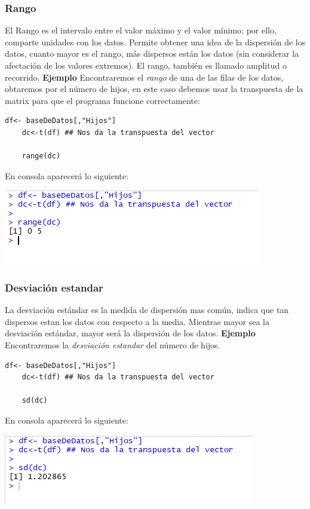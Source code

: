 \documentclass[12pt,hidelinks]{article}
\begin{document}
	\subsubsection{Rango}
	El Rango es el intervalo entre el valor máximo y el valor mínimo; por ello, comparte unidades con los datos. Permite obtener una idea de la dispersión de los datos, cuanto mayor es el rango, más dispersos están los datos (sin considerar la afectación de los valores extremos). El rango, también es llamado amplitud o recorrido. \textbf{Ejemplo} Encontraremos el \textit{rango} de una de las filas de los datos, obtaremos por el número de hijos, en este caso debemos usar la transpuesta de la matrix para que el programa funcione correctamente:
	\begin{lstlisting}[frame=single]
	df<- baseDeDatos[,"Hijos"]
	dc<-t(df) ## Nos da la transpuesta del vector
	
	range(dc)
	\end{lstlisting}
	En consola aparecerá lo siguiente:
	\begin{center}
		\includegraphics[]{Rango.PNG}
	\end{center}
	\subsubsection{Desviación estandar}
	La desviación estándar es la medida de dispersión mas común, indica que tan dispersos estan los datos con respecto a la media. Mientras mayor sea la desviación estándar, mayor será la dispersión de los datos. \textbf{Ejemplo} Encontraremos la \textit{desviación estandar} del número de hijos.
	\begin{lstlisting}[frame=single]
	df<- baseDeDatos[,"Hijos"]
	dc<-t(df) ## Nos da la transpuesta del vector
	
	sd(dc)
	\end{lstlisting}
	En consola aparecerá lo siguiente:
	\begin{center}
		\includegraphics[]{Desviacion_estandar.PNG}
	\end{center}
\end{document}
